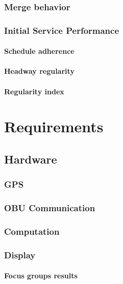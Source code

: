 \documentclass[11pt,letterpaper,]{report}
\begin{document}
\subsection{Merge behavior}

\subsection{Initial Service Performance}

\subsubsection{Schedule adherence}

\subsubsection{Headway regularity}

\subsubsection{Regularity index}

\chapter{Requirements}

\section{Hardware}

\subsection{GPS}

\subsection{OBU Communication}

\subsection{Computation}

\subsection{Display}

\subsubsection{Focus groups results}
\end{document}
